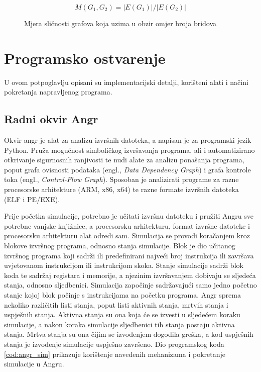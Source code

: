 \begin{figure}[htb]
    \centering
    \[M(G_1, G_2) = |E(G_1)|/|E(G_2)| \]
    \caption{Mjera sličnosti grafova koja uzima u obzir omjer broja bridova}
    \label{eqn:mjera_slicnosti}
\end{figure}


\section{Programsko ostvarenje}



U ovom potpoglavlju opisani su implementacijski detalji, korišteni alati i
načini pokretanja napravljenog programa.

\subsection{Radni okvir Angr}
Okvir angr je alat za analizu izvršnih datoteka, a napisan je za programski 
jezik Python. Pruža mogućnost simboličkog izvršavanja programa, ali i automatizirano 
otkrivanje sigurnosnih ranjivosti te nudi alate za analizu ponašanja programa,
poput grafa ovisnosti podataka (engl., \textit{Data Dependency Graph}) i grafa
kontrole toka (engl., \textit{Control-Flow Graph}). Sposoban je analizirati
programe za razne procesorske arhitekture (ARM, x86, x64) te razne formate
izvršnih datoteka (ELF i PE/EXE).


Prije početka simulacije, potrebno je učitati izvršnu datoteku i pružiti
Angru sve potrebne vanjske knjižnice, a procesorsku arhitekturu, format
izvršne datoteke i procesorsku arhitekturu alat odredi sam. Simulacija se
provodi koračanjem kroz blokove izvršnog programa, odnosno stanja simulacije. Blok
je dio učitanog izvršnog programa koji sadrži ili predefinirani najveći broj 
instrukcija ili završava uvjetovanom instrukcijom ili instrukcijom skoka.
Stanje simulacije sadrži blok koda te sadržaj registara i memorije, a njezinim
izvršavanjem dobivaju se sljedeća stanja, odnosno sljedbenici. Simulacija
započinje sadržavajući samo jedno početno stanje kojoj blok počinje s
instrukcijama na početku programa. Angr sprema nekoliko različitih
listi stanja, poput listi aktivnih stanja, mrtvih stanja i uspješnih stanja.
Aktivna stanja su ona koja će se izvesti u sljedećem koraku simulacije, a nakon
koraka simulacije sljedbenici tih stanja postaju aktivna stanja. Mrtva stanja su
ona čijim se izvođenjem dogodila greška, a kod uspješnih stanja je izvođenje
simulacije uspješno završeno. Dio programskog koda \ref{cod:angr_sim} prikazuje korištenje
navedenih mehanizama i pokretanje simulacije u Angru.

